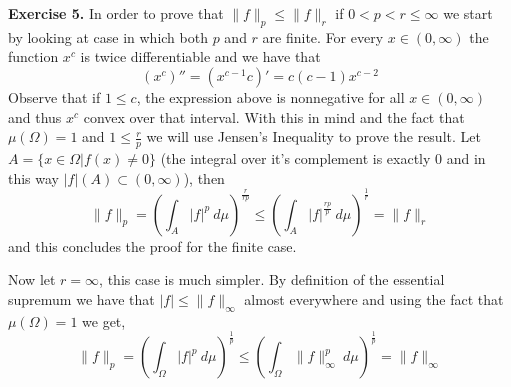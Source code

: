 \documentclass{article}
\begin{document}
\begin{exercise}\textbf{Exercise 5.}
    In order to prove that $ \|f\|_p \le \|f\|_r$ if $0 < p < r \le \infty$ we start by looking at case in which both $p$ and $r$ are finite. For every $x \in \left( 0,\infty \right) $ the function $x^{c}$ is twice differentiable and we have that
    \[
        \left( x^c \right)'' = \left( x^{c-1}c \right) ' = c \left( c-1 \right) x^{c-2}
    \]
    Observe that if $1 \le c$, the expression above is nonnegative for all $x \in \left( 0,\infty \right)$ and thus $x^c$ convex over that interval. With this in mind and the fact that $\mu \left( \Omega \right) = 1$ and $1 \le \frac{r}{p}$ we will use Jensen's Inequality to prove the result. Let $A = \{x \in \Omega | f \left( x \right) \neq 0 \}$ (the integral over it's complement is exactly $0$ and in this way $|f| \left( A \right) \subset \left( 0,\infty \right)$), then  
    \[
        \|f\|_p = \left( \int_A |f|^p\: d\mu  \right)^{\frac{r}{rp}} \le \left( \int_A |f|^{\frac{rp}{p}}\: d\mu  \right)^\frac{1}{r} = \|f\|_r 
    \]
    and this concludes the proof for the finite case.

    Now let $r = \infty$, this case is much simpler. By definition of the essential supremum we have that $|f| \le \|f\|_\infty $ almost everywhere and using the fact that $\mu \left( \Omega \right) = 1$ we get,
    \[
        \|f\|_p = \left( \int_\Omega |f|^p\: d\mu  \right)^\frac{1}{p} \le \left( \int_\Omega \|f\|_\infty^p \: d\mu  \right) ^\frac{1}{p} = \|f\|_\infty 
    \]
    
\end{exercise}

\bigbreak
\end{document}
